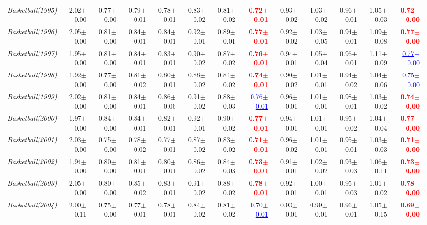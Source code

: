 \documentclass[nohyperref]{article}
\theoremstyle{plain}
\theoremstyle{definition}
\theoremstyle{remark}
\newcommand{\red}[1]{\textcolor{red}{\textbf{#1}}}
\newcommand{\blue}[1]{\textcolor{blue}{\underline{#1}}}
\begin{document}
\begin{table*}[!ht]
{\begin{tabular}{lrr|rrrrr|rrrrr}
			{\it Basketball(1995)} & 2.02$\pm$0.00 & 0.77$\pm$0.00 & 0.79$\pm$0.01 & 0.78$\pm$0.01 & 0.83$\pm$0.02 & 0.81$\pm$0.02 & \red{0.72$\pm$0.01} & 0.93$\pm$0.02 & 1.03$\pm$0.02 & 0.96$\pm$0.01 & 1.05$\pm$0.03 & \red{0.72$\pm$0.00} \\
			{\it Basketball(1996)} & 2.05$\pm$0.00 & 0.81$\pm$0.00 & 0.84$\pm$0.01 & 0.84$\pm$0.01 & 0.92$\pm$0.01 & 0.89$\pm$0.01 & \red{0.77$\pm$0.01} & 0.92$\pm$0.02 & 1.03$\pm$0.05 & 0.94$\pm$0.01 & 1.09$\pm$0.08 & \red{0.77$\pm$0.00} \\
			{\it Basketball(1997)} & 1.95$\pm$0.00 & 0.81$\pm$0.00 & 0.84$\pm$0.01 & 0.83$\pm$0.01 & 0.90$\pm$0.02 & 0.87$\pm$0.02 & \red{0.76$\pm$0.01} & 0.94$\pm$0.01 & 1.05$\pm$0.04 & 0.96$\pm$0.01 & 1.11$\pm$0.09 & \blue{0.77$\pm$0.00} \\
			{\it Basketball(1998)} & 1.92$\pm$0.00 & 0.77$\pm$0.00 & 0.81$\pm$0.02 & 0.80$\pm$0.01 & 0.88$\pm$0.02 & 0.84$\pm$0.02 & \red{0.74$\pm$0.01} & 0.90$\pm$0.02 & 1.01$\pm$0.01 & 0.94$\pm$0.02 & 1.04$\pm$0.06 & \blue{0.75$\pm$0.00} \\
			{\it Basketball(1999)} & 2.02$\pm$0.00 & 0.81$\pm$0.00 & 0.84$\pm$0.01 & 0.86$\pm$0.06 & 0.91$\pm$0.02 & 0.88$\pm$0.03 & \blue{0.76$\pm$0.01} & 0.96$\pm$0.01 & 1.01$\pm$0.01 & 0.98$\pm$0.01 & 1.03$\pm$0.02 & \red{0.74$\pm$0.00} \\
			{\it Basketball(2000)} & 1.97$\pm$0.00 & 0.84$\pm$0.00 & 0.84$\pm$0.01 & 0.82$\pm$0.01 & 0.92$\pm$0.01 & 0.90$\pm$0.02 & \red{0.77$\pm$0.01} & 0.94$\pm$0.01 & 1.01$\pm$0.01 & 0.95$\pm$0.02 & 1.04$\pm$0.04 & \red{0.77$\pm$0.00} \\
			{\it Basketball(2001)} & 2.03$\pm$0.00 & 0.75$\pm$0.00 & 0.78$\pm$0.02 & 0.77$\pm$0.01 & 0.87$\pm$0.02 & 0.83$\pm$0.02 & \red{0.71$\pm$0.01} & 0.96$\pm$0.02 & 1.01$\pm$0.01 & 0.95$\pm$0.01 & 1.03$\pm$0.03 & \red{0.71$\pm$0.00} \\
			{\it Basketball(2002)} & 1.94$\pm$0.00 & 0.80$\pm$0.00 & 0.81$\pm$0.01 & 0.80$\pm$0.01 & 0.86$\pm$0.02 & 0.84$\pm$0.03 & \red{0.73$\pm$0.01} & 0.91$\pm$0.01 & 1.02$\pm$0.02 & 0.93$\pm$0.03 & 1.06$\pm$0.11 & \red{0.73$\pm$0.00} \\
			{\it Basketball(2003)} & 2.05$\pm$0.00 & 0.80$\pm$0.00 & 0.85$\pm$0.02 & 0.83$\pm$0.01 & 0.91$\pm$0.02 & 0.88$\pm$0.02 & \red{0.78$\pm$0.01} & 0.92$\pm$0.01 & 1.00$\pm$0.01 & 0.95$\pm$0.03 & 1.01$\pm$0.02 & \red{0.78$\pm$0.00} \\
			{\it Basketball(2004)} & 2.00$\pm$0.11 & 0.75$\pm$0.00 & 0.77$\pm$0.01 & 0.78$\pm$0.01 & 0.84$\pm$0.02 & 0.81$\pm$0.02 & \blue{0.70$\pm$0.01} & 0.93$\pm$0.01 & 0.99$\pm$0.01 & 0.96$\pm$0.01 & 1.05$\pm$0.15 & \red{0.69$\pm$0.00} \\

\end{tabular}}
\end{table*}
\end{document}

